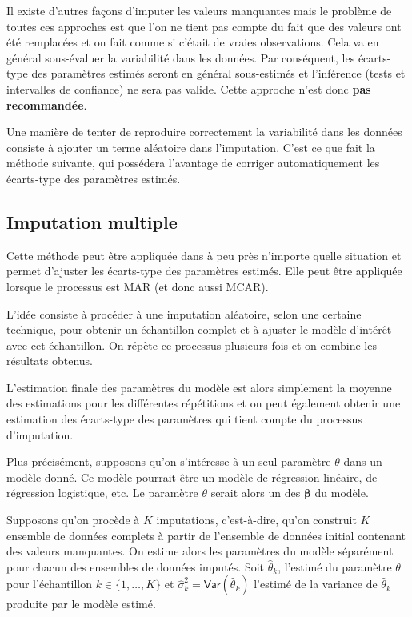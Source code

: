 \documentclass[
  11pt,
  letterpaper,
]{book}
\theoremstyle{definition}
\theoremstyle{definition}
\theoremstyle{definition}
\theoremstyle{remark}
\begin{document}
Il existe d'autres façons d'imputer les valeurs manquantes mais le problème de toutes ces approches est que l'on ne tient pas compte du fait que des valeurs ont été remplacées et on fait comme si c'était de vraies observations. Cela va en général sous-évaluer la variabilité dans les données. Par conséquent, les écarts-type des paramètres estimés seront en général sous-estimés et l'inférence (tests et intervalles de confiance) ne sera pas valide.
Cette approche n'est donc \textbf{pas recommandée}.

Une manière de tenter de reproduire correctement la variabilité dans les données consiste à ajouter un terme aléatoire dans l'imputation. C'est ce que fait la méthode suivante, qui possédera l'avantage de corriger automatiquement les écarts-type des paramètres estimés.

\hypertarget{imputation-multiple}{%
\subsection{Imputation multiple}\label{imputation-multiple}}

Cette méthode peut être appliquée dans à peu près n'importe quelle situation et permet d'ajuster les écarts-type des paramètres estimés. Elle peut être appliquée lorsque le processus est MAR (et donc aussi MCAR).

L'idée consiste à procéder à une imputation aléatoire, selon une certaine technique, pour obtenir un échantillon complet et à ajuster le modèle d'intérêt avec cet échantillon. On répète ce processus plusieurs fois et on combine les résultats obtenus.

L'estimation finale des paramètres du modèle est alors simplement la moyenne des estimations pour les différentes répétitions et on peut également obtenir une estimation des écarts-type des paramètres qui tient compte du processus d'imputation.

Plus précisément, supposons qu'on s'intéresse à un seul paramètre \(\theta\) dans un modèle donné. Ce modèle pourrait être un modèle de régression linéaire, de régression logistique, etc. Le paramètre \(\theta\) serait alors un des \(\boldsymbol{\beta}\) du modèle.

Supposons qu'on procède à \(K\) imputations, c'est-à-dire, qu'on construit \(K\) ensemble de données complets à partir de l'ensemble de données initial contenant des valeurs manquantes. On estime alors les paramètres du modèle séparément pour chacun des ensembles de données imputés. Soit \(\widehat{\theta}_k\), l'estimé du paramètre \(\theta\) pour l'échantillon \(k \in \{1, \ldots, K\}\) et \(\widehat{\sigma}_k^2={\mathsf{Var}}\left(\widehat{\theta}_k\right)\) l'estimé de la variance de \(\widehat{\theta}_k\) produite par le modèle estimé.
\end{document}
